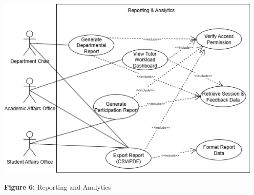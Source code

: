 \begin{center}
\includegraphics[width=0.9\linewidth]{images/UC-05.png}
\end{center}

\begin{center}
\textbf{Figure 6:}  Reporting and Analytics
\end{center}


